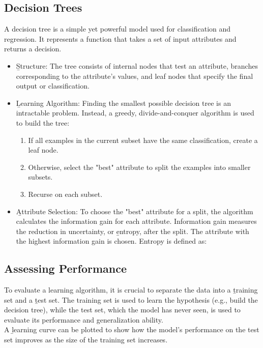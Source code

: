 \subsection{Decision Trees}
A decision tree is a simple yet powerful model used for classification and regression. It represents a function that takes a set of input attributes and returns a decision.
\begin{itemize}
    \item \b{Structure:} The tree consists of internal nodes that test an attribute, branches corresponding to the attribute's values, and leaf nodes that specify the final output or classification.
    \item \b{Learning Algorithm:} Finding the smallest possible decision tree is an intractable problem. Instead, a greedy, divide-and-conquer algorithm is used to build the tree:
    \begin{enumerate}
        \item If all examples in the current subset have the same classification, create a leaf node.
        \item Otherwise, select the "best" attribute to split the examples into smaller subsets.
        \item Recurse on each subset.
    \end{enumerate}
    \item \b{Attribute Selection:} To choose the "best" attribute for a split, the algorithm calculates the information gain for each attribute. Information gain measures the reduction in uncertainty, or \b{entropy}, after the split. The attribute with the highest information gain is chosen. Entropy is defined as:
\end{itemize}

\subsection{Assessing Performance}
To evaluate a learning algorithm, it is crucial to separate the data into a \b{training set} and a \b{test set}. The training set is used to learn the hypothesis (e.g., build the decision tree), while the test set, which the model has never seen, is used to evaluate its performance and generalization ability.\\
A \b{learning curve} can be plotted to show how the model's performance on the test set improves as the size of the training set increases.